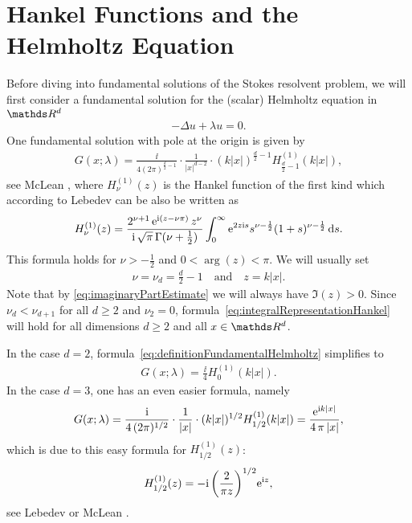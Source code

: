 \section{Hankel Functions and the Helmholtz Equation}
\label{sec:hankel}

Before diving into fundamental solutions of the Stokes resolvent problem, we will first consider a fundamental solution for the (scalar) Helmholtz equation in $\R^d$
\begin{align*}
-\Delta u + \lambda u = 0.
\end{align*}
One fundamental solution with pole at the origin is given by
\begin{align}
  \label{eq:definitionFundamentalHelmholtz}
  G(x; \lambda) = \frac{\ii}{4 ( 2\pi )^{\frac{d}{2} - 1}} \cdot \frac{1}{|x|^{d - 2}} \cdot (k |x|)^{\frac{d}{2} - 1} H_{\frac{d}{2} - 1}^{(1)} (k|x|),
\end{align}
see McLean \cite[Eq.\@~9.14)]{mclean}, where $H_{\nu}^{(1)}(z)$ is the Hankel function of the first kind which according to Lebedev \cite[Sec.\@~5.11]{lebedev} can be also be written as
\begin{align}
  \label{eq:integralRepresentationHankel}
  H_\nu^{(1)}(z) = \frac{2^{\nu + 1} \, \mathrm{e}^{\mathrm{i}(z - \nu \pi)}\, z^\nu}{\mathrm{i}\, \sqrt{\pi}\, \Gamma(\nu + \frac{1}{2})} \int_0^\infty \mathrm{e}^{2 z \mathrm{i} s} s^{\nu - \frac{1}{2}} (1 + s)^{\nu - \frac{1}{2}} \, {\operatorname{d}\!{s}}.
\end{align}
This formula holds for $\nu > -\frac{1}{2}$ and $0 < \arg(z) < \pi$.
We will usually set 
\begin{align*}
  \nu = \nu_d = \frac{d}{2} - 1 \quad\text{and}\quad z = k|x|. 
\end{align*}
Note that by \eqref{eq:imaginaryPartEstimate} we will always have $\Im(z) > 0$. 
Since $\nu_d < \nu_{d + 1}$ for all $d \geq 2$ and $\nu_2 = 0$, formula~\eqref{eq:integralRepresentationHankel} will hold for all dimensions $d \geq 2$ and all $x \in \R^d$.

In the case $d = 2$, formula~\eqref{eq:definitionFundamentalHelmholtz} simplifies to 
\begin{align}
  \label{eq:2dDefinitionFundamentalHelmholtz}
  G(x;\lambda) = \frac{\ii}{4} H_{0}^{(1)}(k|x|).
\end{align}
In the case $d = 3$, one has an even easier formula, namely
\begin{align}
  \label{eq:3dDefinitionFundamentalHelmholtz}
  G(x; \lambda) = \frac{\mathrm{i}}{4\, (2\pi)^{1/2}} \cdot \frac{1}{|x|} \cdot (k |x|)^{1/2} H_{1/2}^{(1)}(k|x|) =  \frac{\mathrm{e}^{\mathrm{i} k |x|}}{4\, \pi\, |x|},
\end{align}
which is due to this easy formula for $H_{1/2}^{(1)}(z)$:
\begin{align}
  \label{eq:Hankel3d}
  H_{1/2}^{(1)}(z) = -\mathrm{i}\, \bigg(\frac{2}{\pi z} \bigg)^{1/2} \mathrm{e}^{\mathrm{i} z},
\end{align}
see Lebedev \cite[Eq.\@~(5.8.4)]{lebedev} or McLean \cite[Eq.\@~(9.15)]{mclean}.

